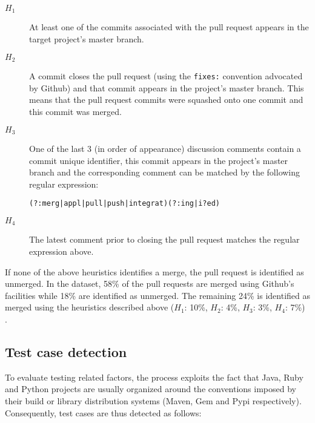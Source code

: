 \documentclass{sig-alternate}
\begin{document}
\begin{description}

  \item[$H_1$] At least one of the commits associated with the pull request appears in the target project's master branch.

  \item[$H_2$] A commit closes the pull request (using the \texttt{fixes:}
    convention advocated by Github) and that commit appears in the project's
    master branch.  This means that the pull request commits were squashed onto
    one commit and this commit was merged.

  \item[$H_3$] One of the last 3 (in order of appearance) discussion comments
    contain a commit unique identifier, this commit appears in the project's
    master branch and the corresponding comment can be matched by the following
    regular expression:

    \begin{small}
    \texttt{(?:merg|appl|pull|push|integrat)(?:ing|i?ed)}
    \end{small}

  \item[$H_4$] The latest comment prior to closing the pull request matches the
    regular expression above.

\end{description}

If none of the above heuristics identifies a merge, the pull request is
identified as unmerged. In the dataset, 58\% of the pull requests are
merged using Github's facilities while 18\% are identified as unmerged.
The remaining 24\% is identified as merged using the heuristics described
above ($H_1$: 10\%, $H_2$: 4\%, $H_3$: 3\%, $H_4$: 7\%) .

\subsection{Test case detection}

To evaluate testing related factors, the process exploits the fact that Java,
Ruby and Python projects are usually organized around the conventions imposed by
their build or library distribution systems (Maven, Gem and Pypi respectively).
Consequently, test cases are thus detected as follows:
\end{document}
